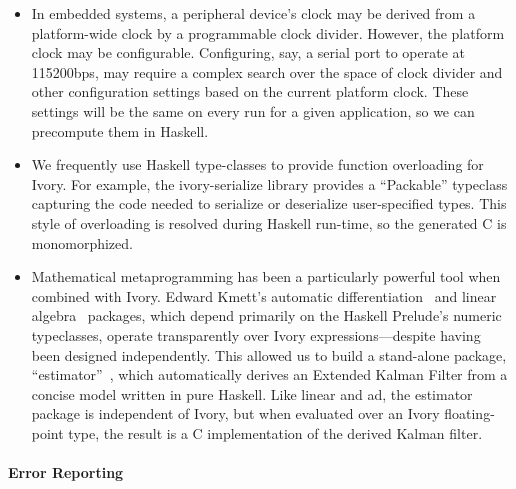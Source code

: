 \begin{itemize}
\item In embedded systems, a peripheral device's clock may be derived from a
  platform-wide clock by a programmable clock divider. However, the platform
  clock may be configurable. Configuring, say, a serial port to operate at
  115200bps, may require a complex search over the space of clock divider and
  other configuration settings based on the current platform clock. These
  settings will be the same on every run for a given application, so we can
  precompute them in Haskell.
\item We frequently use Haskell type-classes to provide function overloading for
  Ivory. For example, the ivory-serialize library provides a ``Packable''
  typeclass capturing the code needed to serialize or deserialize user-specified
  types. This style of overloading is resolved during Haskell run-time, so the
  generated C is monomorphized.
\item Mathematical metaprogramming has been a particularly powerful tool when combined
with Ivory. Edward Kmett's automatic differentiation~\cite{ad} and linear
algebra~\cite{linear} packages, which depend primarily on the Haskell Prelude's
numeric typeclasses, operate transparently over Ivory expressions---despite
having been designed independently. This allowed us to build a stand-alone
package, ``estimator''~\cite{estimator}, which automatically derives an Extended
Kalman Filter from a concise model written in pure Haskell. Like linear and ad,
the estimator package is independent of Ivory, but when evaluated over an Ivory
floating-point type, the result is a C implementation of the derived Kalman
filter.
\end{itemize}

\paragraph{Error Reporting}


